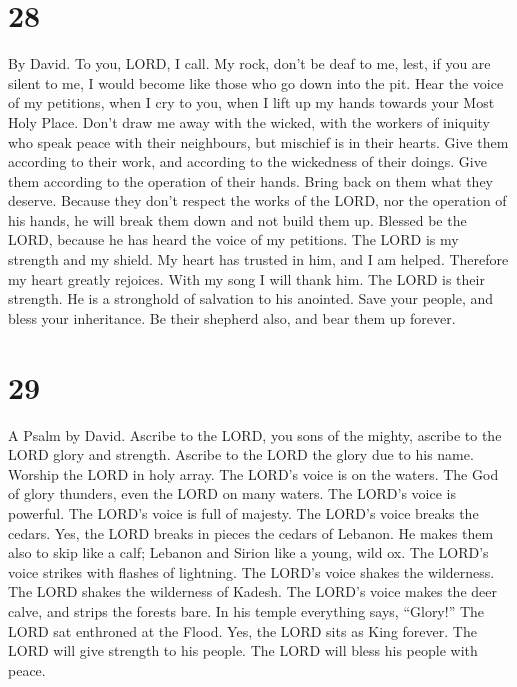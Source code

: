 \hypertarget{section-27}{%
\section{28}\label{section-27}}

By David.  To you, LORD, I call. My rock, don't be deaf to
me, lest, if you are silent to me, I would become like those who go down
into the pit.  Hear the voice of my petitions, when I cry to
you, when I lift up my hands towards your Most Holy Place. 
Don't draw me away with the wicked, with the workers of iniquity who
speak peace with their neighbours, but mischief is in their hearts.
 Give them according to their work, and according to the
wickedness of their doings. Give them according to the operation of
their hands. Bring back on them what they deserve.  Because
they don't respect the works of the LORD, nor the operation of his
hands, he will break them down and not build them up. 
Blessed be the LORD, because he has heard the voice of my petitions.
 The LORD is my strength and my shield. My heart has trusted
in him, and I am helped. Therefore my heart greatly rejoices. With my
song I will thank him.  The LORD is their strength. He is a
stronghold of salvation to his anointed.  Save your people,
and bless your inheritance. Be their shepherd also, and bear them up
forever.

\hypertarget{section-28}{%
\section{29}\label{section-28}}

A Psalm by David.  Ascribe to the LORD, you sons of the
mighty, ascribe to the LORD glory and strength.  Ascribe to
the LORD the glory due to his name. Worship the LORD in holy array.
 The LORD's voice is on the waters. The God of glory
thunders, even the LORD on many waters.  The LORD's voice is
powerful. The LORD's voice is full of majesty.  The LORD's
voice breaks the cedars. Yes, the LORD breaks in pieces the cedars of
Lebanon.  He makes them also to skip like a calf; Lebanon
and Sirion like a young, wild ox.  The LORD's voice strikes
with flashes of lightning.  The LORD's voice shakes the
wilderness. The LORD shakes the wilderness of Kadesh.  The
LORD's voice makes the deer calve, and strips the forests bare. In his
temple everything says, ``Glory!''  The LORD sat enthroned
at the Flood. Yes, the LORD sits as King forever.  The LORD
will give strength to his people. The LORD will bless his people with
peace.

